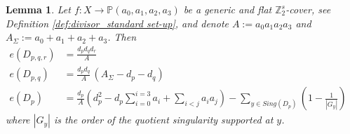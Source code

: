 \documentclass[12pt,twoside,]{amsart}
\theoremstyle{plain}
\newtheorem{lemma}[theorem]{Lemma}
\theoremstyle{definition}
\begin{document}
\begin{lemma}\label{lemma:strata_explicit}
Let $f: X \rightarrow \mathbb{P}(a_0,a_1,a_2,a_3)$ be a generic and flat $\mathbb{Z}_2^s$-cover, see Definition \ref{def:divisor_standard set-up},  and denote
$A:=a_0a_1a_2a_3$ and $A_\Sigma:=a_0+a_1+a_2+a_3$. Then
\begin{align*}
  e(D_{p,q,r}) &= \displaystyle\frac{d_pd_qd_r}{A} 
  &&
  \\
  e(D_{p,q})  &=  \frac{d_p d_q}{A}\,(A_\Sigma-d_p-d_q) 
  &&
  \\
  e(D_{p})  &= 
\frac{d_p}{A} \left(
d_p^2
- d_p\sum_{i=0}^{i=3} a_i
+ \sum_{i<j} a_ia_j 
\right)
-
\sum_{y \in Sing(D_p)} \left( 1 - \frac{1}{|G_y|} \right)
&&
\end{align*}
where $|G_y|$ is the order of the quotient singularity supported at $y$.
\end{lemma}
\end{document}
